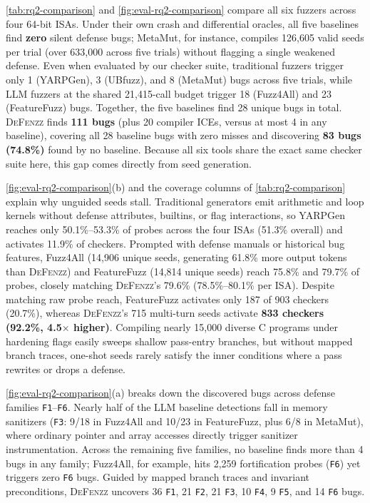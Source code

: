 \documentclass[conference,compsoc]{IEEEtran}
\begin{document}
\autoref{tab:rq2-comparison} and \autoref{fig:eval-rq2-comparison} compare all six fuzzers across four 64-bit ISAs. Under their own crash and differential oracles, all five baselines find \textbf{zero} silent defense bugs; MetaMut, for instance, compiles 126,605 valid seeds per trial (over 633,000 across five trials) without flagging a single weakened defense. Even when evaluated by our checker suite, traditional fuzzers trigger only 1 (YARPGen), 3 (UBfuzz), and 8 (MetaMut) bugs across five trials, while LLM fuzzers at the shared 21,415-call budget trigger 18 (Fuzz4All) and 23 (FeatureFuzz) bugs. Together, the five baselines find 28 unique bugs in total. \textsc{DeFenzz} finds \textbf{111 bugs} (plus 20 compiler ICEs, versus at most 4 in any baseline), covering all 28 baseline bugs with zero misses and discovering \textbf{83 bugs (74.8\%)} found by no baseline. Because all six tools share the exact same checker suite here, this gap comes directly from seed generation.

\autoref{fig:eval-rq2-comparison}(b) and the coverage columns of \autoref{tab:rq2-comparison} explain why unguided seeds stall. Traditional generators emit arithmetic and loop kernels without defense attributes, builtins, or flag interactions, so YARPGen reaches only 50.1\%--53.3\% of probes across the four ISAs (51.3\% overall) and activates 11.9\% of checkers. Prompted with defense manuals or historical bug features, Fuzz4All (14,906 unique seeds, generating 61.8\% more output tokens than \textsc{DeFenzz}) and FeatureFuzz (14,814 unique seeds) reach 75.8\% and 79.7\% of probes, closely matching \textsc{DeFenzz}'s 79.6\% (78.5\%--80.1\% per ISA). Despite matching raw probe reach, FeatureFuzz activates only 187 of 903 checkers (20.7\%), whereas \textsc{DeFenzz}'s 715 multi-turn seeds activate \textbf{833 checkers (92.2\%, 4.5$\times$ higher)}. Compiling nearly 15,000 diverse C programs under hardening flags easily sweeps shallow pass-entry branches, but without mapped branch traces, one-shot seeds rarely satisfy the inner conditions where a pass rewrites or drops a defense.

\autoref{fig:eval-rq2-comparison}(a) breaks down the discovered bugs across defense families \texttt{F1}--\texttt{F6}. Nearly half of the LLM baseline detections fall in memory sanitizers (\texttt{F3}: 9/18 in Fuzz4All and 10/23 in FeatureFuzz, plus 6/8 in MetaMut), where ordinary pointer and array accesses directly trigger sanitizer instrumentation. Across the remaining five families, no baseline finds more than 4 bugs in any family; Fuzz4All, for example, hits 2,259 fortification probes (\texttt{F6}) yet triggers zero \texttt{F6} bugs. Guided by mapped branch traces and invariant preconditions, \textsc{DeFenzz} uncovers 36 \texttt{F1}, 21 \texttt{F2}, 21 \texttt{F3}, 10 \texttt{F4}, 9 \texttt{F5}, and 14 \texttt{F6} bugs.
\end{document}
